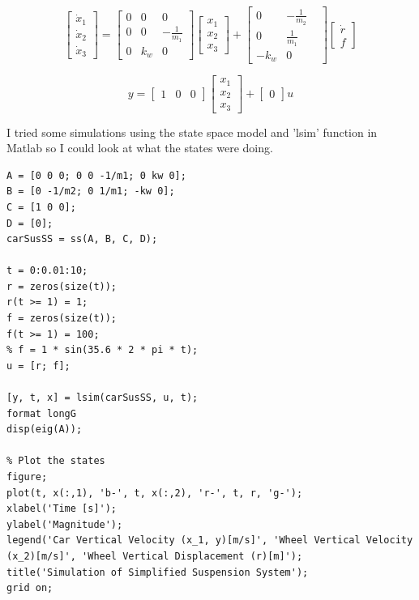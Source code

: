 \documentclass{article}
\begin{document}
\[
\begin{bmatrix}
\dot{x}_1 \\
\dot{x}_2 \\
\dot{x}_3 
\end{bmatrix}
=
\begin{bmatrix}
0 & 0 & 0 \\
0 & 0 & -\frac{1}{m_1} \\
0 & k_w & 0  
\end{bmatrix}
\begin{bmatrix}
x_1 \\
x_2 \\
x_3 
\end{bmatrix}
+
\begin{bmatrix}
0 & -\frac{1}{m_2}\\
0 & \frac{1}{m_1} \\
-k_w & 0& 
\end{bmatrix}
\begin{bmatrix}
\dot{r} \\
f
\end{bmatrix}
\]

\[
y = 
\begin{bmatrix}
1 & 0 & 0
\end{bmatrix}
\begin{bmatrix}
x_1 \\
x_2 \\
x_3 
\end{bmatrix}
+
\begin{bmatrix}
0
\end{bmatrix}
u
\]

I tried some simulations using the state space model and 'lsim' function in Matlab so I could look at what the states were doing.

\begin{lstlisting}[style=matlabstyle]
A = [0 0 0; 0 0 -1/m1; 0 kw 0]; 
B = [0 -1/m2; 0 1/m1; -kw 0];       
C = [1 0 0];        
D = [0];  
carSusSS = ss(A, B, C, D);

t = 0:0.01:10; 
r = zeros(size(t)); 
r(t >= 1) = 1;
f = zeros(size(t)); 
f(t >= 1) = 100;
% f = 1 * sin(35.6 * 2 * pi * t);
u = [r; f];

[y, t, x] = lsim(carSusSS, u, t);
format longG
disp(eig(A));

% Plot the states
figure;
plot(t, x(:,1), 'b-', t, x(:,2), 'r-', t, r, 'g-');
xlabel('Time [s]');
ylabel('Magnitude');
legend('Car Vertical Velocity (x_1, y)[m/s]', 'Wheel Vertical Velocity (x_2)[m/s]', 'Wheel Vertical Displacement (r)[m]');
title('Simulation of Simplified Suspension System');
grid on;
\end{lstlisting}
\end{document}
